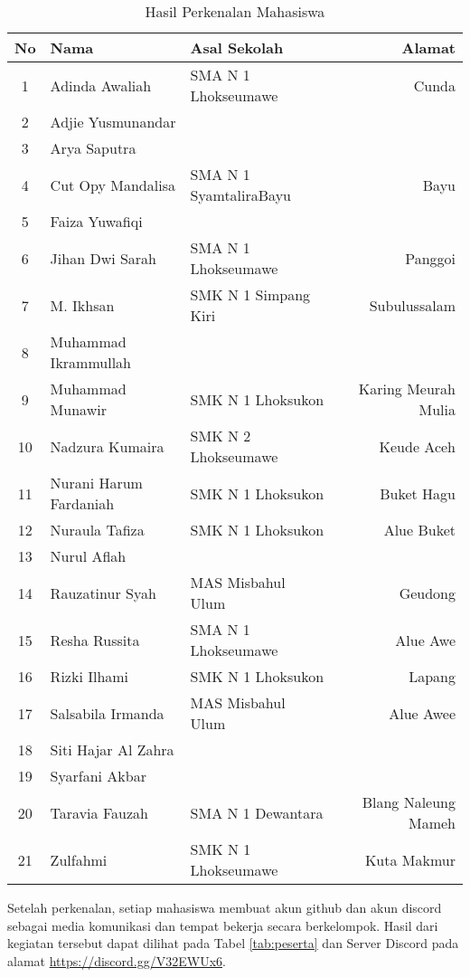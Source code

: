 \documentclass[a4paper]{tufte-handout}
\begin{document}
\begin{table}[!ht]
\vspace*{.5cm}
\caption{Hasil Perkenalan Mahasiswa}
\label{tab:perkenalan}
\centering
\begin{tabular}{cllr} 
\toprule
No & Nama 					& Asal Sekolah 			& Alamat\\
\midrule
1 & Adinda Awaliah			& SMA N 1 Lhokseumawe 	& Cunda \\
2 & Adjie Yusmunandar		& & \\
3 & Arya Saputra			& & \\
4 & Cut Opy Mandalisa		& SMA N 1 SyamtaliraBayu	& Bayu \\
5 & Faiza Yuwafiqi			& & \\
6 & Jihan Dwi Sarah			& SMA N 1 Lhokseumawe 	& Panggoi \\
7 & M. Ikhsan				& SMK N 1 Simpang Kiri 	& Subulussalam \\
\midrule
8 & Muhammad Ikrammullah	& & \\
9 & Muhammad Munawir		& SMK N 1 Lhoksukon		& Karing Meurah Mulia \\
10 & Nadzura Kumaira		& SMK N 2 Lhokseumawe 	& Keude Aceh \\
11 & Nurani Harum Fardaniah	& SMK N 1 Lhoksukon 	& Buket Hagu \\
12 & Nuraula Tafiza			& SMK N 1 Lhoksukon 	& Alue Buket \\
13 & Nurul Aflah			& & \\
14 & Rauzatinur Syah		& MAS Misbahul Ulum 	& Geudong \\
\midrule
15 & Resha Russita			& SMA N 1 Lhokseumawe 	& Alue Awe \\
16 & Rizki Ilhami			& SMK N 1 Lhoksukon 	& Lapang \\
17 & Salsabila Irmanda		& MAS Misbahul Ulum 	& Alue Awee \\
18 & Siti Hajar Al Zahra	& & \\
19 & Syarfani Akbar			& & \\
20 & Taravia Fauzah			& SMA N 1 Dewantara 	& Blang Naleung Mameh \\
21 & Zulfahmi				& SMK N 1 Lhokseumawe	& Kuta Makmur \\
\bottomrule
\end{tabular}
\end{table}

Setelah perkenalan, setiap mahasiswa membuat akun github dan akun discord sebagai media komunikasi dan tempat bekerja secara berkelompok. Hasil dari kegiatan tersebut dapat dilihat pada Tabel \ref{tab:peserta} dan Server Discord pada alamat \url{https://discord.gg/V32EWUx6}.
\end{document}
